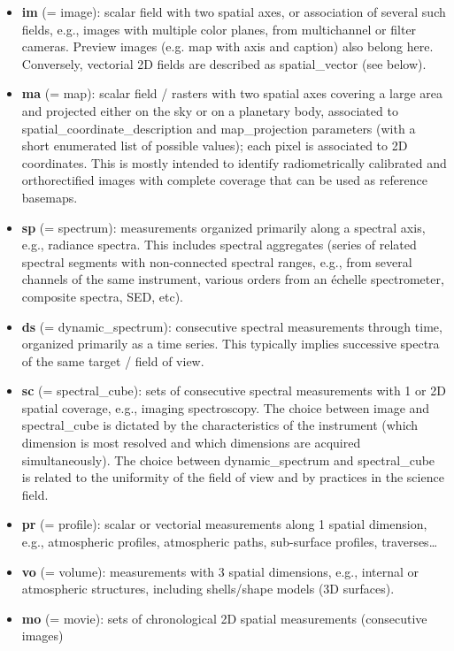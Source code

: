 \documentclass[11pt,a4paper]{ivoa}
\begin{document}
\begin{itemize}
\item \textbf{im }(= image): scalar field with two spatial axes, or association of several such fields, e.g., images with multiple color planes, from multichannel or filter cameras. Preview images (e.g. map with axis and caption) also belong here. Conversely, vectorial 2D fields are described as spatial\_vector (see below).
\item \textbf{ma }(= map): scalar field / rasters with two spatial axes covering a large area and projected either on the sky or on a planetary body, associated to spatial\_coordinate\_description and map\_projection parameters (with a short enumerated list of possible values); each pixel is associated to 2D coordinates. This is mostly intended to identify radiometrically calibrated and orthorectified images with complete coverage that can be used as reference basemaps. 
\item \textbf{sp }(= spectrum): measurements organized primarily along a spectral axis, e.g., radiance spectra. This includes spectral aggregates (series of related spectral segments with non-connected spectral ranges, e.g., from several channels of the same instrument, various orders from an échelle spectrometer, composite spectra, SED, etc).
\item \textbf{ds }(= dynamic\_spectrum): consecutive spectral measurements through time, organized primarily as a time series. This typically implies successive spectra of the same target / field of view.
\item \textbf{sc }(= spectral\_cube): sets of consecutive spectral measurements with 1 or 2D spatial coverage, e.g., imaging spectroscopy. The choice between image and spectral\_cube is dictated by the characteristics of the instrument (which dimension is most resolved and which dimensions are acquired simultaneously). The choice between dynamic\_spectrum and spectral\_cube is related to the uniformity of the field of view and by practices in the science field.
\item \textbf{pr }(= profile): scalar or vectorial measurements along 1 spatial dimension, e.g., atmospheric profiles, atmospheric paths, sub-surface profiles, traverses…
\item \textbf{vo }(= volume): measurements with 3 spatial dimensions, e.g., internal or atmospheric structures, including shells/shape models (3D surfaces).
\item \textbf{mo }(= movie): sets of chronological 2D spatial measurements (consecutive images)

\end{itemize}
\end{document}
